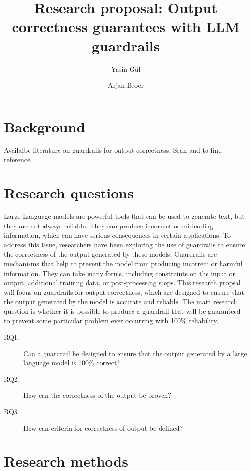 \documentclass[a4paper,doc,natbib]{apa6}
\title{Research proposal: Output correctness guarantees with LLM guardrails}
\author{Yasin G\"{u}l \and Arjan Broer}
\affiliation{Open University of the Netherlands}
\begin{document}
    \maketitle

    \section{Background}

    Availalbe literature on guardrails for output correctness. Scan \cite{dong2024safeguarding} and \cite{ayyamperumal2024current} to find reference.

    \section{Research questions}

    Large Language models are powerful tools that can be used to generate text, but they are not always reliable.
    They can produce incorrect or misleading information, which can have serious consequences in certain applications.
    To address this issue, researchers have been exploring the use of guardrails to ensure the correctness of the output generated by these models.
    Guardrails are mechanisms that help to prevent the model from producing incorrect or harmful information.
    They can take many forms, including constraints on the input or output, additional training data, or post-processing steps.
    This research propsal will focus on guardrails for output correctness, which are designed to ensure that the output generated by the model is accurate and reliable.
    The main research question is whether it is possible to produce a guardrail that will be guaranteed to prevent some particular problem ever occurring with 100\% reliability.

    \begin{description}
        \item[RQ1.] Can a guardrail be designed to ensure that the output generated by a large language model is 100\% correct?
        \item[RQ2.] How can the correctness of the output be proven?
        \item[RQ3.] How can criteria for correctness of output be defined?
    \end{description}


    \section{Research methods}
\end{document}

